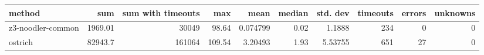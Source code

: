 \begin{tabular}{lrrrrrrrrr}
\hline
 method            &      sum &   sum with timeouts &    max &     mean &   median &   std. dev &   timeouts &   errors &   unknowns \\
\hline
 z3-noodler-common &  1969.01 &               30049 &  98.64 & 0.074799 &     0.02 &    1.1888  &        234 &        0 &          0 \\
 ostrich           & 82943.7  &              161064 & 109.54 & 3.20493  &     1.93 &    5.53755 &        651 &       27 &          0 \\
\hline
\end{tabular}
